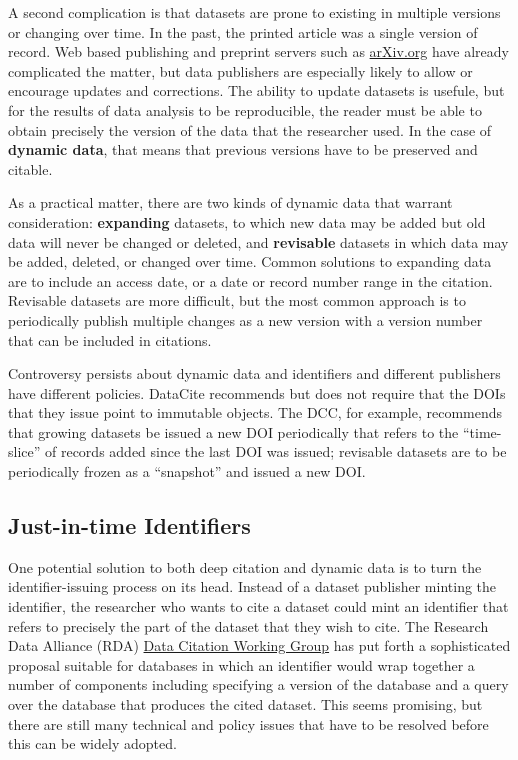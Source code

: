 \documentclass[10pt,twocolumn]{article}
\begin{document}
A second complication is that datasets are prone to existing in multiple versions or changing over time. 
In the past, the printed article was a single version of record.
Web based publishing and preprint servers such as \href{http://arxiv.org/}{arXiv.org} have already complicated the matter, but data publishers are especially likely to allow or encourage updates and corrections. 
The ability to update datasets is usefule, but for the results of data analysis to be reproducible, the reader must be able to obtain precisely the version of the data that the researcher used. 
In the case of \textbf{dynamic data}, that means that previous versions have to be preserved and citable.

As a practical matter, there are two kinds of dynamic data that warrant consideration: \textbf{expanding} datasets, to which new data may be added but old data will never be changed or deleted, and \textbf{revisable} datasets in which data may be added, deleted, or changed over time. 
Common solutions to expanding data are to include an access date, or a date or record number range in the citation. 
Revisable datasets are more difficult, but the most common approach is to periodically publish multiple changes as a new version with a version number that can be included in citations.

Controversy persists about dynamic data and identifiers and different publishers have different policies. 
DataCite recommends but does not require that the DOIs that they issue point to immutable objects. 
The DCC, for example, recommends that growing datasets be issued a new DOI periodically that refers to the ``time-slice'' of records added since the last DOI was issued; revisable datasets are to be periodically frozen as a ``snapshot'' and issued a new DOI.

\subsection*{Just-in-time Identifiers}\label{just-in-time-identifiers}

One potential solution to both deep citation and dynamic data is to turn the identifier-issuing process on its head. 
Instead of a dataset publisher minting the identifier, the researcher who wants to cite a dataset could mint an identifier that refers to precisely the part of the dataset that they wish to cite. 
The Research Data Alliance (RDA) \href{http://rd-alliance.org/working-groups/data-citation-wg.html}{Data Citation Working Group} has put forth a sophisticated proposal suitable for databases in which an identifier would wrap together a number of components including specifying a version of the database and a query over the database that produces the cited dataset. 
This seems promising, but there are still many technical and policy issues that have to be resolved before this can be widely adopted.
\end{document}
